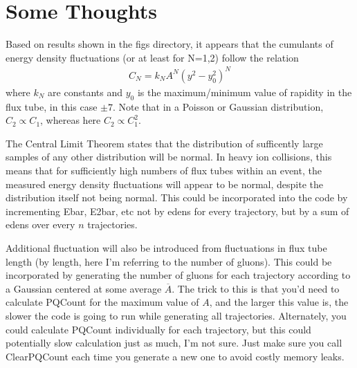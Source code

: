 \documentclass{article}
\begin{document}
\section*{Some Thoughts}
Based on results shown in the figs directory, it appears that the cumulants of energy density fluctuations (or at least for N=1,2) follow the relation
\begin{align*}
C_N = k_N A^N (y^2 - y_0^2)^N
\end{align*}
where $k_N$ are constants and $y_0$ is the maximum/minimum value of rapidity in the flux tube, in this case $\pm 7$. Note that in a Poisson or Gaussian distribution, $C_2 \propto C_1$, whereas here $C_2 \propto C_1^2$. 

The Central Limit Theorem states that the distribution of sufficently large samples of any other distribution will be normal. In heavy ion collisions, this means that for sufficiently high numbers of flux tubes within an event, the measured energy density fluctuations will appear to be normal, despite the distribution itself not being normal. This could be incorporated into the code by incrementing Ebar, E2bar, etc not by edens for every trajectory, but by a sum of edens over every $n$ trajectories. 

Additional fluctuation will also be introduced from fluctuations in flux tube length (by length, here I'm referring to the number of gluons). This could be incorporated by generating the number of gluons for each trajectory according to a Gaussian centered at some average $\overline{A}$. The trick to this is that you'd need to calculate PQCount for the maximum value of $A$, and the larger this value is, the slower the code is going to run while generating all trajectories. Alternately, you could calculate PQCount individually for each trajectory, but this could potentially slow calculation just as much, I'm not sure. Just make sure you call ClearPQCount each time you generate a new one to avoid costly memory leaks.
\end{document}
